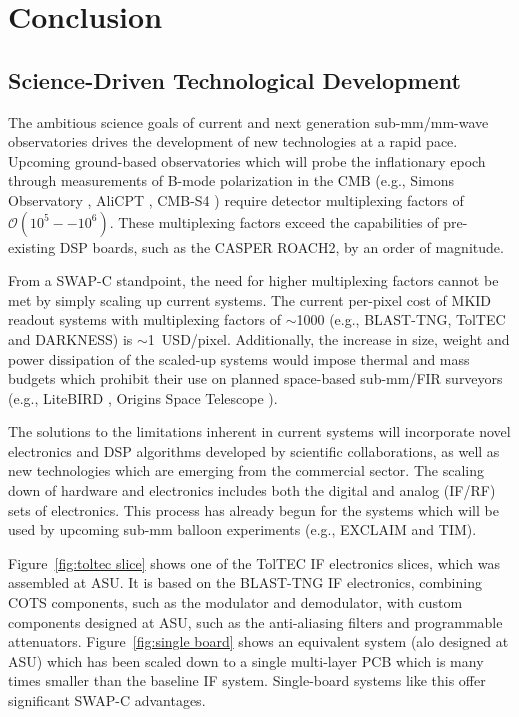 \chapter{Conclusion}\label{conclusion}

\section{Science-Driven Technological Development}

The ambitious science goals of current and next generation sub-mm/mm-wave observatories drives the development of new technologies at a rapid pace. Upcoming ground-based observatories which will probe the inflationary epoch through measurements of B-mode polarization in the CMB (e.g., Simons Observatory \citep{ade2019simons}, AliCPT \citep{li2018probing}, CMB-S4 \citep{abitbol2017cmb}) require detector multiplexing factors of $\mathcal{O}(10^{5}--10^{6})$. These multiplexing factors exceed the capabilities of pre-existing DSP boards, such as the CASPER ROACH2, by an order of magnitude.

From a SWAP-C standpoint, the need for higher multiplexing factors cannot be met by simply scaling up current systems. The current per-pixel cost of MKID readout systems with multiplexing factors of $\sim$1000 (e.g., BLAST-TNG, TolTEC and DARKNESS) is $\sim$1~USD/pixel. Additionally, the increase in size, weight and power dissipation of the scaled-up systems would impose thermal and mass budgets which prohibit their use on planned space-based sub-mm/FIR surveyors (e.g., LiteBIRD \citep{matsumura2014mission}, Origins Space Telescope \citep{battersby2018origins}).

The solutions to the limitations inherent in current systems will incorporate novel electronics and DSP algorithms developed by scientific collaborations, as well as new technologies which are emerging from the commercial sector. The scaling down of hardware and electronics includes both the digital and analog (IF/RF) sets of electronics. This process has already begun for the systems which will be used by upcoming sub-mm balloon experiments (e.g., EXCLAIM and TIM).

Figure~\ref{fig:toltec slice} shows one of the TolTEC IF electronics slices, which was assembled at ASU. It is based on the BLAST-TNG IF electronics, combining COTS components, such as the modulator and demodulator, with custom components designed at ASU, such as the anti-aliasing filters and programmable attenuators. Figure~\ref{fig:single board} shows an equivalent system (alo designed at ASU) which has been scaled down to a single multi-layer PCB which is many times smaller than the baseline IF system. Single-board systems like this offer significant SWAP-C advantages.

